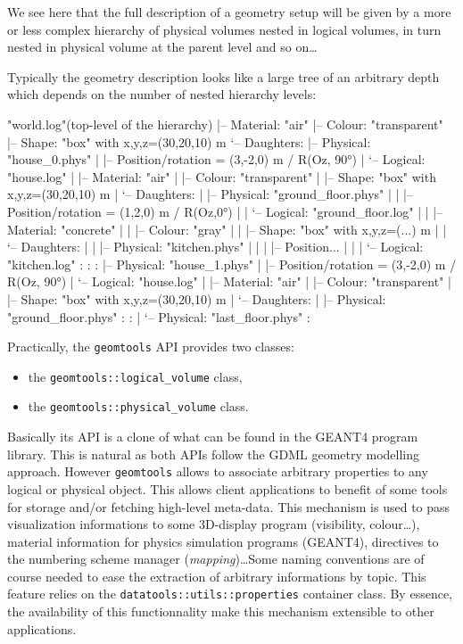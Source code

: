 We see  here that  the full  description of a  geometry setup  will be
given by a  more or less complex hierarchy  of physical volumes nested
in logical  volumes, in turn nested  in physical volume  at the parent
level and so on\dots

Typically the geometry description looks like a large tree
of an arbitrary depth which depends on the number of nested
hierarchy levels:
\begin{ShellVerbatim}
"world.log"(top-level of the hierarchy)
|-- Material: "air"
|-- Colour: "transparent"
|-- Shape: "box" with x,y,z=(30,20,10) m 
`-- Daughters:
    |-- Physical: "house_0.phys"
    |    |-- Position/rotation = (3,-2,0) m / R(Oz, 90°)
    |    `-- Logical: "house.log"
    |        |-- Material: "air"
    |        |-- Colour: "transparent"
    |        |-- Shape: "box" with x,y,z=(30,20,10) m 
    |        `-- Daughters:
    |            |-- Physical: "ground_floor.phys"
    |            |   |-- Position/rotation = (1,2,0) m / R(Oz,0°)
    |            |   `-- Logical: "ground_floor.log"
    |            |       |-- Material: "concrete"
    |            |       |-- Colour: "gray"
    |            |       |-- Shape: "box" with x,y,z=(...) m 
    |            |       `-- Daughters:
    |            |           |-- Physical: "kitchen.phys"
    |            |           |    |-- Position...
    |            |           |    `-- Logical: "kitchen.log"
    :            :           :
    |-- Physical: "house_1.phys"
    |    |-- Position/rotation = (3,-2,0) m / R(Oz, 90°)
    |    `-- Logical: "house.log"
    |        |-- Material: "air"
    |        |-- Colour: "transparent"
    |        |-- Shape: "box" with x,y,z=(30,20,10) m 
    |        `-- Daughters:
    |            |-- Physical: "ground_floor.phys"
    :            :   
    |            `-- Physical: "last_floor.phys"
    :
\end{ShellVerbatim}

\pn Practically, the \texttt{geomtools} API provides
two classes:
\begin{itemize}
\item the \texttt{geomtools::logical\_volume} class,
\item the \texttt{geomtools::physical\_volume} class.
\end{itemize}
\pn Basically its  API is a clone  of what can be found  in the GEANT4
program library. This is natural as both APIs follow the GDML geometry
modelling approach. However \texttt{geomtools} allows to associate arbitrary
properties to any logical or physical object. This allows
client applications to benefit of some tools for storage and/or fetching
high-level meta-data. This mechanism is used to pass visualization informations
to some 3D-display program (visibility, colour\dots), material information
for physics simulation programs (GEANT4), directives to the numbering scheme
manager (\emph{mapping})\dots Some naming conventions are of course needed
to ease the extraction of arbitrary informations by topic. This
feature relies on the \texttt{datatools::utils::properties} container class.
By essence, the availability of this functionnality make this mechanism
extensible to other applications. 

